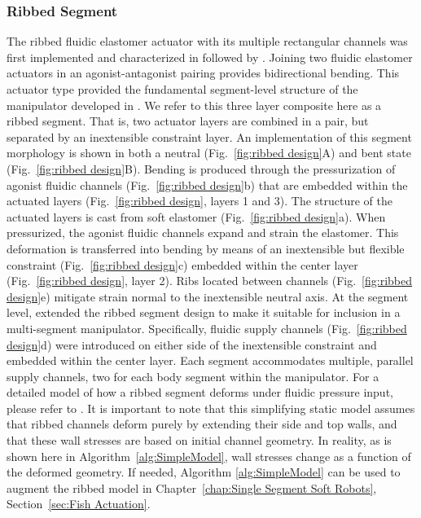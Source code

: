 \subsubsection{Ribbed Segment}
\label{subsubsec:Actuators, Actuator Morphologies, Ribbed}
The ribbed fluidic elastomer actuator with its multiple rectangular channels was first implemented and characterized in \citet{correll2010soft} followed by \citet{onal2011soft, onal2013autonomous}.
%
Joining two fluidic elastomer actuators in an agonist-antagonist pairing provides bidirectional bending.
%
This actuator type provided the fundamental segment-level structure of the manipulator developed in \citet{marchese2014design}.
%
We refer to this three layer composite here as a ribbed segment.
%
That is, two actuator layers are combined in a pair, but separated by an inextensible constraint layer.
%
An implementation of this segment morphology is shown in both a neutral (Fig.~\ref{fig:ribbed design}A) and bent state (Fig.~\ref{fig:ribbed design}B).
%
Bending is produced through the pressurization of agonist fluidic channels (Fig.~\ref{fig:ribbed design}b) that are embedded within the actuated layers (Fig.~\ref{fig:ribbed design}, layers 1 and 3).
%
The structure of the actuated layers is cast from soft elastomer (Fig.~\ref{fig:ribbed design}a).
%
When pressurized, the agonist fluidic channels expand and strain the elastomer.
%
This deformation is transferred into bending by means of an inextensible but flexible constraint (Fig.~\ref{fig:ribbed design}c) embedded within the center layer (Fig.~\ref{fig:ribbed design}, layer 2).
%
Ribs located between channels (Fig.~\ref{fig:ribbed design}e) mitigate strain normal to the inextensible neutral axis.
%
At the segment level, \citet{marchese2014design} extended the ribbed segment design to make it suitable for inclusion in a multi-segment manipulator.
%
Specifically, fluidic supply channels (Fig.~\ref{fig:ribbed design}d) were introduced on either side of the inextensible constraint and embedded within the center layer.
%
Each segment accommodates multiple, parallel supply channels, two for each body segment within the manipulator.
%
For a detailed model of how a ribbed segment deforms under fluidic pressure input, please refer to \citet{marchese2014autonomous}. %
%
It is important to note that this simplifying static model assumes that ribbed channels deform purely by extending their side and top walls, and that these wall stresses are based on initial channel geometry.
%
In reality, as is shown here in Algorithm~\ref{alg:SimpleModel}, wall stresses change as a function of the deformed geometry.
If needed, Algorithm \ref{alg:SimpleModel} can be used to augment the ribbed model in Chapter~\ref{chap:Single Segment Soft Robots}, Section~\ref{sec:Fish Actuation}.

